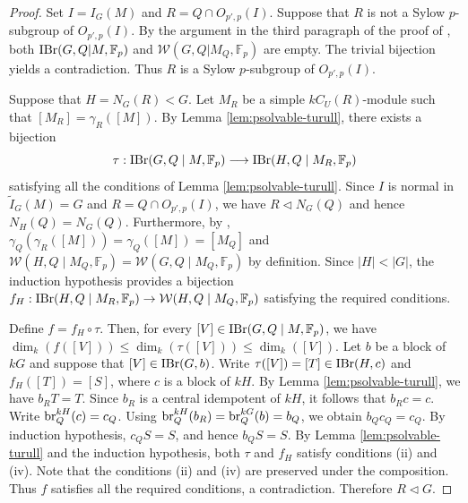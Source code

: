 \documentclass[preprint,12pt,3p]{elsarticle}
\def\IBr{{\rm IBr}}
\def\br{{\rm br}}
\def\W{\mathcal{W}}
\def\F{\mathbb{F}}
\begin{document}
\begin{proof}
Set $I=I_G(M)$ and
$R=Q\cap O_{p',p}(I)$. Suppose that $R$ is not a Sylow $p$-subgroup of $O_{p',p}(I)$.
By the argument in the third paragraph of
the proof of \cite[Theorem 7.1]{Turull14}, both
$\IBr(G,Q | M,\F_p)$ and $\W(G,Q | M_Q,\F_p)$ are empty. The trivial bijection yields a contradiction.
Thus $R$ is a Sylow $p$-subgroup of $O_{p',p}(I)$.

Suppose that $H=N_G(R)<G$.
Let $M_R$ be a simple
$kC_U(R)$-module such that $[M_R] = \gamma_R ([M])$.
By Lemma \ref{lem:psolvable-turull},
there exists a bijection
\[
\tau: \IBr(G,Q\mid M,\F_p) \longrightarrow
\IBr(H,Q\mid M_R,\F_p)
\]
satisfying all the conditions of Lemma \ref{lem:psolvable-turull}.
Since $I$ is normal in $\widetilde{I}_G(M)=G$ and $R = Q \cap O_{p',p}(I)$, we have $R \triangleleft N_G(Q)$ and hence
$N_H(Q)=N_G(Q)$.
Furthermore, by \cite[Theorem 2.9 and Problems (2.7)]{Navarro2018},
$\gamma_Q(\gamma_R([M]))
=
\gamma_Q([M])
=
[M_Q]$ and $\W(H,Q\mid M_Q,\F_p)
=
\W(G,Q\mid M_Q,\F_p)$ by definition.
Since $|H|<|G|$, the induction
hypothesis provides a bijection
$f_H:
\IBr(H,Q\mid M_R,\F_p)
\to
\W(H,Q\mid M_Q,\F_p)$
satisfying the required conditions.

Define
$f=f_H\circ\tau$.
Then, for every
$[V]\in\IBr(G,Q\mid M,\F_p)$,
we have 
$\dim_k(f([V])) \leq \dim_k(\tau([V])) \leq\dim_k([V])$.
Let $b$ be a block of $kG$ and suppose that
$[V]\in\IBr(G,b)$.
Write
$\tau([V])=[T]\in\IBr(H,c)$ and
$f_H([T])=[S]$,
where $c$ is a block of $kH$.
By Lemma \ref{lem:psolvable-turull},
we have $b_R T=T$.
Since $b_R$ is a central idempotent of
$kH$, it follows that $b_Rc=c$.
Write $\br_Q^{kH} (c) = c_Q$.
Using
$\br_Q^{kH}(b_R)=\br_Q^{kG}(b)=b_Q$,
we obtain
$b_Qc_Q=c_Q$.
By induction hypothesis, $c_Q S=S$, and hence
$b_QS=S$.
By Lemma \ref{lem:psolvable-turull} and the induction hypothesis, both $\tau$ and $f_H$ satisfy conditions (ii) and (iv).
Note that the conditions (ii) and (iv) are
preserved under the composition.
Thus $f$ satisfies all the required conditions, a contradiction.
Therefore
$R\triangleleft G$.


\end{proof}
\end{document}
